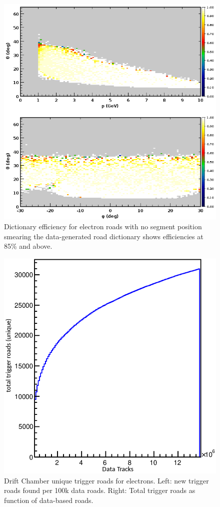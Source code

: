 \begin{figure}[hbt]
	\centering
	\includegraphics[width=1.0\columnwidth,keepaspectratio]{img/dc_neg_data_efficiency_nosmearing.png}
	\caption{Dictionary efficiency for electron roads with no segment position smearing the data-generated road dictionary shows efficiencies at 85\% and above.}
	\label{fig:dc_neg_data_efficiency_nosmearing}
\end{figure}

\begin{figure}[hbt]
	\centering
	\includegraphics[width=1.0\columnwidth,keepaspectratio]{img/dc_neg_data_dictionary.png}
	\caption{Drift Chamber unique trigger roads for electrons. Left: new trigger roads found per 100k data roads. Right: Total trigger roads as function of data-based roads.}
	\label{fig:dc_neg_data_dictionary}
\end{figure}



